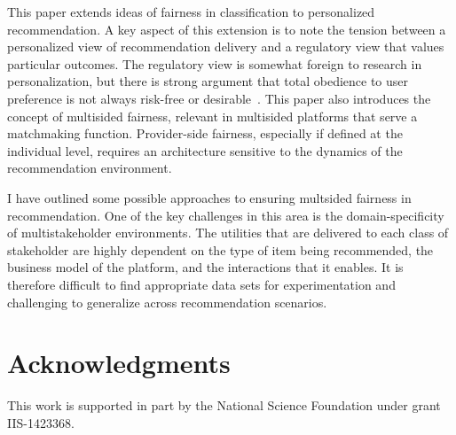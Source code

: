 This paper extends ideas of fairness in classification to personalized recommendation. A key aspect of this extension is to note the tension between a personalized view of recommendation delivery and a regulatory view that values particular outcomes. The regulatory view is somewhat foreign to research in personalization, but there is strong argument that total obedience to user preference is not always risk-free or desirable~\cite{pariser2011filter,sunstein2009republic}. This paper also introduces the concept of multisided fairness, relevant in multisided platforms that serve a matchmaking function. Provider-side fairness, especially if defined at the individual level, requires an architecture sensitive to the dynamics of the recommendation environment.

I have outlined some possible approaches to ensuring multsided fairness in recommendation. One of the key challenges in this area is the domain-specificity of multistakeholder environments. The utilities that are delivered to each class of stakeholder are highly dependent on the type of item being recommended, the business model of the platform, and the interactions that it enables. It is therefore difficult to find appropriate data sets for experimentation and challenging to generalize across recommendation scenarios.

\section{Acknowledgments}
\noindent This work is supported in part by the National Science Foundation under grant IIS-1423368.


